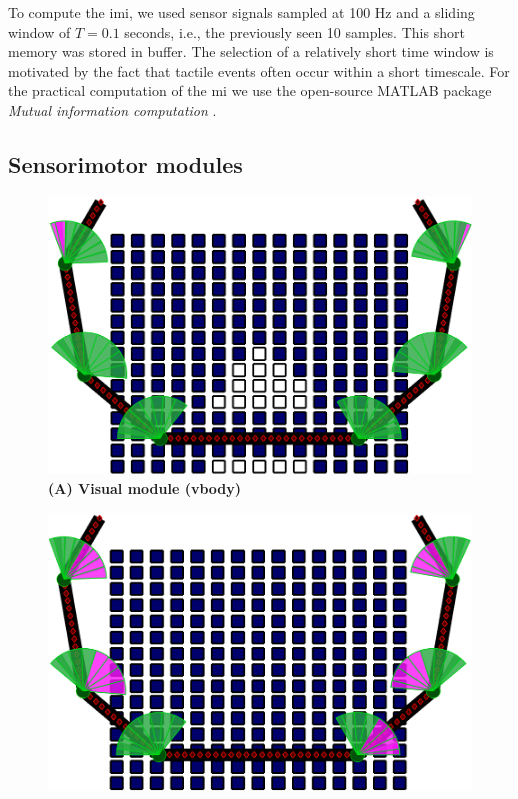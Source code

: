 To compute the \ac{imi}, we used sensor signals sampled at 100 Hz and a sliding window of $T = 0.1$ seconds, i.e., the previously seen 10 samples. This short memory was stored in buffer. The selection of a relatively short time window is motivated by the fact that tactile events often occur within a short timescale. For the practical computation of the \ac{mi}
we use the open-source MATLAB package \emph{Mutual information computation} \cite{PengMutualInformationcomputation}.


\subsection{Sensorimotor modules}
\begin{figure}[h!]
    \centering
    \begin{minipage}{0.32\textwidth}
        \centering
        \includegraphics[width=\linewidth]{fig/modules_repr_v.png}
        \textbf{(A) Visual module (vbody)}
    \end{minipage}
    \hfill
    \begin{minipage}{0.32\textwidth}
        \centering
        \includegraphics[width=\linewidth]{modules_repr_p.png}

\end{minipage}
\end{figure}
